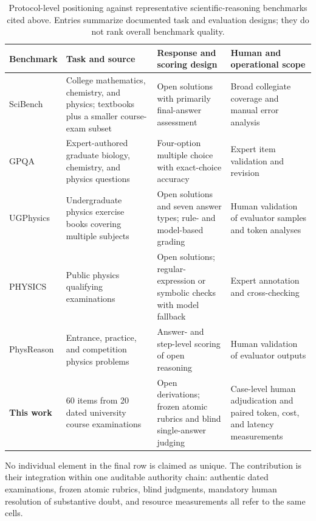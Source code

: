 \documentclass[11pt,a4paper,twocolumn]{article}
\begin{document}
\begin{table}[!t]
\centering
\caption{Protocol-level positioning against representative scientific-reasoning
benchmarks cited above. Entries summarize documented task and evaluation
designs; they do not rank overall benchmark quality.}
\label{tab:benchmark-positioning}
\footnotesize
\setlength{\tabcolsep}{3.2pt}
\renewcommand{\arraystretch}{1.08}
\begin{tabularx}{\textwidth}{P{2.75cm}P{4.0cm}P{5.0cm}Y}
\toprule
\textbf{Benchmark} & \textbf{Task and source} & \textbf{Response and scoring design} &
\textbf{Human and operational scope} \\
\midrule
SciBench \citep{wang2024scibench} & College mathematics, chemistry, and
physics; textbooks plus a smaller course-exam subset & Open solutions with
primarily final-answer assessment & Broad collegiate coverage and manual error
analysis \\
GPQA \citep{rein2024gpqa} & Expert-authored graduate biology, chemistry, and
physics questions & Four-option multiple choice with exact-choice accuracy &
Expert item validation and revision \\
UGPhysics \citep{xu2025ugphysics} & Undergraduate physics exercise books
covering multiple subjects & Open solutions and seven answer types; rule- and
model-based grading & Human validation of evaluator samples and token analyses \\
PHYSICS \citep{feng2025physics} & Public physics qualifying examinations &
Open solutions; regular-expression or symbolic checks with model fallback &
Expert annotation and cross-checking \\
PhysReason \citep{zhang2025physreason} & Entrance, practice, and competition
physics problems & Answer- and step-level scoring of open reasoning & Human
validation of evaluator outputs \\
\textbf{This work} & 60 items from 20 dated university course examinations &
Open derivations; frozen atomic rubrics and blind single-answer judging &
Case-level human adjudication and paired token, cost, and latency measurements \\
\bottomrule
\end{tabularx}
\end{table}

No individual element in the final row is claimed as unique. The contribution
is their integration within one auditable authority chain: authentic dated
examinations, frozen atomic rubrics, blind judgments, mandatory human resolution
of substantive doubt, and resource measurements all refer to the same cells.
\end{document}
